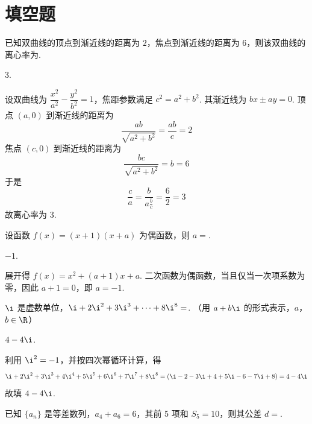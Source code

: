 \section{填空题}

\begin{problem}
已知双曲线的顶点到渐近线的距离为 \(2\)，焦点到渐近线的距离为 \(6\)，则该双曲线的离心率为\fillinblank{}.
\end{problem}

\begin{answer}
\(3\).
\end{answer}

\begin{solution}
设双曲线为 \(\dfrac{x^2}{a^2}-\dfrac{y^2}{b^2}=1\)，焦距参数满足 \(c^2=a^2+b^2\). 其渐近线为 \(bx\pm ay=0\). 顶点 \((a,0)\) 到渐近线的距离为
\[
\frac{ab}{\sqrt{a^2+b^2}}=\frac{ab}{c}=2
\]
焦点 \((c,0)\) 到渐近线的距离为
\[
\frac{bc}{\sqrt{a^2+b^2}}=b=6
\]
于是
\[
\frac ca=\frac{b}{a\frac{b}{c}}=\frac{6}{2}=3
\]
故离心率为 \(3\).
\end{solution}

\begin{problem}
设函数 \( f(x) = (x + 1)(x + a) \) 为偶函数，则 \( a = \)\fillinblank{}.
\end{problem}

\begin{answer}
\(-1\).
\end{answer}

\begin{solution}
展开得 \(f(x)=x^2+(a+1)x+a\). 二次函数为偶函数，当且仅当一次项系数为零，因此 \(a+1=0\)，即 \(a=-1\).
\end{solution}

\begin{problem}
\(\i\) 是虚数单位，\(\i + 2\i^2 + 3\i^3 + \cdots + 8\i^8 = \)\fillinblank{}. （用 \(a + b\i\) 的形式表示，\(a\)，\(b \in \R\)）
\end{problem}

\begin{answer}
\(4 - 4\i\).
\end{answer}

\begin{solution}
利用 \(\i^2=-1\)，并按四次幂循环计算，得
\[
\i+2\i^2+3\i^3+4\i^4+5\i^5+6\i^6+7\i^7+8\i^8
=(\i-2-3\i+4+5\i-6-7\i+8)=4-4\i
\]
故填 \(4-4\i\).
\end{solution}

\begin{problem}
已知 \(\{a_{n}\}\) 是等差数列，\(a_{4} + a_{6} = 6\)，其前 5 项和 \(S_{5} = 10\)，则其公差 \(d = \)\fillinblank{}.
\end{problem}

